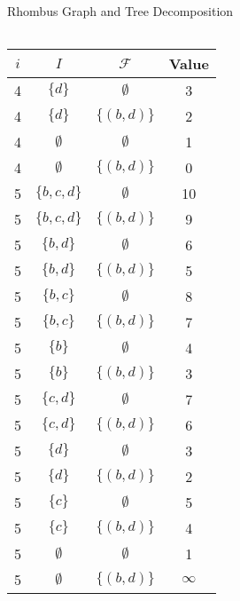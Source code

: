 \documentclass{beamer}
\begin{document}
\begin{frame}{Rhombus Graph and Tree Decomposition}
\begin{minipage}{0.35\textwidth}
\begin{tabular}{|c| >{\small}c | >{\small}c | >{\small}c |}
    \hline
    \end{tabular}
  \end{minipage}
  \begin{minipage}{0.1\textwidth}
    \renewcommand{\arraystretch}{0.5} 
    \setlength{\tabcolsep}{0.7pt} 
    \begin{tabular}{|c| >{\small}c | >{\small}c | >{\small}c |}
    \hline
    \textbf{\(i\)} & \textbf{\(I\)} & \textbf{\(\mathcal{F}\)} & \textbf{Value} \\
    \hline
    4 & \( \{ d \} \) & \( \emptyset \) & 3 \\
    4 & \( \{ d \} \) & \( \{ (b, d) \} \) & 2 \\
    4 & \( \emptyset \) & \( \emptyset \) & 1 \\
    4 & \( \emptyset \) & \( \{ (b, d) \} \) & 0 \\
    \hline
    5 & \( \{ b, c, d \} \) & \( \emptyset \) & 10 \\
    5 & \( \{ b, c, d \} \) & \( \{ (b,d) \} \) & 9 \\
    5 & \( \{ b, d \} \) & \( \emptyset \) & 6 \\
    5 & \( \{ b, d \} \) & \( \{ (b, d) \} \) & 5 \\
    5 & \( \{ b, c \} \) & \( \emptyset \) & 8 \\
    5 & \( \{ b, c \} \) & \( \{ (b, d) \} \) & 7 \\
    5 & \( \{ b \} \) & \( \emptyset \) & 4 \\
    5 & \( \{ b \} \) & \( \{ (b, d) \} \) & 3 \\
    5 & \( \{ c, d \} \) & \( \emptyset \) & 7 \\
    5 & \( \{ c, d \} \) & \( \{ (b, d) \} \) & 6 \\
    5 & \( \{ d \} \) & \( \emptyset \) & 3 \\
    5 & \( \{ d \} \) & \( \{ (b, d) \} \) & 2 \\
    5 & \( \{ c \} \) & \( \emptyset \) & 5 \\
    5 & \( \{ c \} \) & \( \{ (b, d) \} \) & 4 \\
    5 & \( \emptyset \) & \( \emptyset \) & 1 \\
    5 & \( \emptyset \) & \( \{ (b, d) \} \) & \( \infty \) \\
    \hline
    \end{tabular}
  \end{minipage}
\end{frame}
\end{document}
